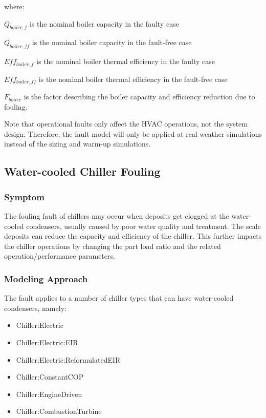where:

\(Q_{boiler,f}\) is the nominal boiler capacity in the faulty case

\(Q_{boiler,ff}\) is the nominal boiler capacity in the fault-free case

\(Eff_{boiler,f}\) is the nominal boiler thermal efficiency in the faulty case

\(Eff_{boiler,ff}\) is the nominal boiler thermal efficiency in the fault-free case

\(F_{boiler}\) is the factor describing the boiler capacity and efficiency reduction due to fouling.

Note that operational faults only affect the HVAC operations, not the system design. Therefore, the fault model will only be applied at real weather simulations instead of the sizing and warm-up simulations.


\subsection{Water-cooled Chiller Fouling}\label{water-cooled-chiller-fouling}

\subsubsection{Symptom}

The fouling fault of chillers may occur when deposits get clogged at the water-cooled condensers, usually caused by poor water quality and treatment. The scale deposits can reduce the capacity and efficiency of the chiller. This further impacts the chiller operations by changing the part load ratio and the related operation/performance parameters.

\subsubsection{Modeling Approach}

The fault applies to a number of chiller types that can have water-cooled condensers, namely:

\begin{itemize}
\tightlist
\item
  Chiller:Electric
\item
  Chiller:Electric:EIR
\item
  Chiller:Electric:ReformulatedEIR
\item
  Chiller:ConstantCOP
\item
  Chiller:EngineDriven
\item
  Chiller:CombustionTurbine
\end{itemize}

